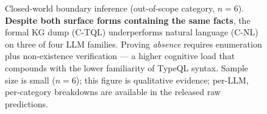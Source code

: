 \begin{figure}[t]
\centering
{}
\caption{Closed-world boundary inference (out-of-scope category, $n=6$).
\textbf{Despite both surface forms containing the same facts}, the
formal KG dump (C-TQL) underperforms natural language (C-NL) on three of
four LLM families. Proving \emph{absence} requires enumeration plus
non-existence verification — a higher cognitive load that compounds with
the lower familiarity of TypeQL syntax. Sample size is small ($n=6$);
this figure is qualitative evidence; per-LLM, per-category breakdowns
are available in the released raw predictions.}
\label{fig:oos}
\end{figure}
